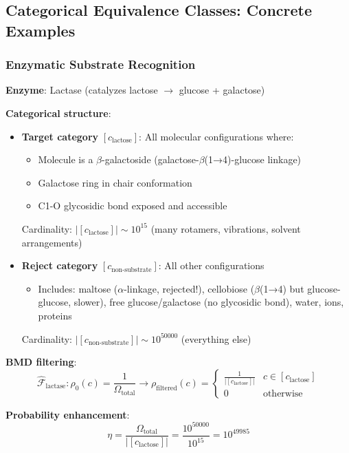 \documentclass[11pt,a4paper]{article}
\begin{document}
\subsection{Categorical Equivalence Classes: Concrete Examples}

\subsubsection{Enzymatic Substrate Recognition}

\textbf{Enzyme}: Lactase (catalyzes lactose $\to$ glucose + galactose)

\textbf{Categorical structure}:
\begin{itemize}
\item \textbf{Target category} $[c_{\text{lactose}}]$: All molecular configurations where:
  \begin{itemize}
  \item Molecule is a $\beta$-galactoside (galactose-$\beta$(1→4)-glucose linkage)
  \item Galactose ring in chair conformation
  \item C1-O glycosidic bond exposed and accessible
  \end{itemize}
  Cardinality: $|[c_{\text{lactose}}]| \sim 10^{15}$ (many rotamers, vibrations, solvent arrangements)

\item \textbf{Reject category} $[c_{\text{non-substrate}}]$: All other configurations
  \begin{itemize}
  \item Includes: maltose ($\alpha$-linkage, rejected!), cellobiose ($\beta$(1→4) but glucose-glucose, slower), free glucose/galactose (no glycosidic bond), water, ions, proteins
  \end{itemize}
  Cardinality: $|[c_{\text{non-substrate}}]| \sim 10^{50000}$ (everything else)
\end{itemize}

\textbf{BMD filtering}:
\begin{equation}
\hat{\mathcal{F}}_{\text{lactase}}: \rho_0(c) = \frac{1}{\Omega_{\text{total}}} \to \rho_{\text{filtered}}(c) = \begin{cases}
\frac{1}{|[c_{\text{lactose}}]|} & c \in [c_{\text{lactose}}] \\
0 & \text{otherwise}
\end{cases}
\end{equation}

\textbf{Probability enhancement}:
\begin{equation}
\eta = \frac{\Omega_{\text{total}}}{|[c_{\text{lactose}}]|} = \frac{10^{50000}}{10^{15}} = 10^{49985}
\end{equation}
\end{document}

